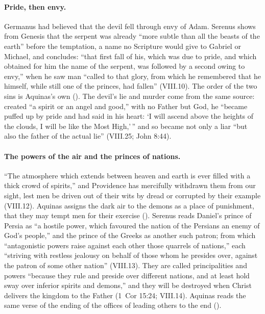 \paragraph{Pride, then envy.} Germanus had believed that the devil fell
through envy of Adam. Serenus shows from Genesis that the serpent was
already ``more subtle than all the beasts of the earth'' before the
temptation, a name no Scripture would give to Gabriel or Michael, and
concludes: ``that first fall of his, which was due to pride, and which
obtained for him the name of the serpent, was followed by a second owing
to envy,'' when he saw man ``called to that glory, from which he
remembered that he himself, while still one of the princes, had fallen''
(VIII.10). The order of the two sins is Aquinas's own ().
The devil's lie and murder come from the same source: created ``a spirit
or an angel and good,'' with no Father but God, he ``became puffed up by
pride and had said in his heart: `I will ascend above the heights of the
clouds, I will be like the Most High,'\,'' and so became not only a liar
``but also the father of the actual lie'' (VIII.25; John 8:44).

\paragraph{The powers of the air and the princes of nations.} ``The
atmosphere which extends between heaven and earth is ever filled with a
thick crowd of spirits,'' and Providence has mercifully withdrawn them
from our sight, lest men be driven out of their wits by dread or corrupted
by their example (VIII.12).
Aquinas assigns the dark air to the demons as a place of punishment, that
they may tempt men for their exercise (). Serenus reads Daniel's prince of Persia as ``a hostile power,
which favoured the nation of the Persians an enemy of God's people,'' and
the prince of the Greeks as another such patron; from which ``antagonistic
powers raise against each other those quarrels of nations,'' each
``striving with restless jealousy on behalf of those whom he presides
over, against the patron of some other nation'' (VIII.13). They are called
principalities and powers ``because they rule and preside over different
nations, and at least hold sway over inferior spirits and demons,'' and
they will be destroyed when Christ delivers the kingdom to the Father (1~Cor
 15:24; VIII.14). Aquinas reads the same verse of the ending of the
offices of leading others to the end ().

